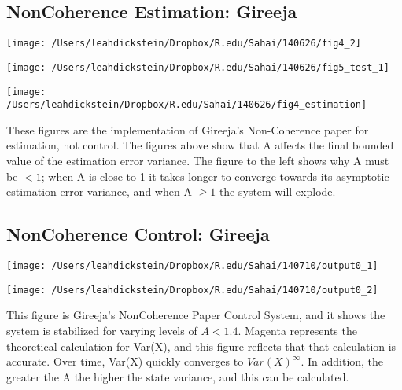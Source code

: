 \documentclass[leqno,twocolumn]{article}
\begin{document}
\subsection{NonCoherence Estimation: Gireeja}
\begin{minipage}[c]{0.5\textwidth}
\texttt{[image: /Users/leahdickstein/Dropbox/R.edu/Sahai/140626/fig4\_2]}
\end{minipage}
\begin{minipage}[c]{0.5\textwidth}
\texttt{[image: /Users/leahdickstein/Dropbox/R.edu/Sahai/140626/fig5\_test\_1]}
\end{minipage}

\begin{minipage}[c]{0.5\textwidth}
\texttt{[image: /Users/leahdickstein/Dropbox/R.edu/Sahai/140626/fig4\_estimation]}
\end{minipage}
\begin{minipage}[b]{0.5\textwidth}
These figures are the implementation of Gireeja's Non-Coherence paper for estimation, not control. The figures above show that A affects the final bounded value of the estimation error variance. The figure to the left shows why A must be $< 1$; when A is close to 1 it takes longer to converge towards its asymptotic estimation error variance, and when A $\geq 1$ the system will explode.
\end{minipage}

\subsection{NonCoherence Control: Gireeja}
\begin{minipage}[c]{0.5\textwidth}
\texttt{[image: /Users/leahdickstein/Dropbox/R.edu/Sahai/140710/output0\_1]}
\end{minipage}
\begin{minipage}[c]{0.5\textwidth}
\texttt{[image: /Users/leahdickstein/Dropbox/R.edu/Sahai/140710/output0\_2]}
\end{minipage}

This figure is Gireeja's NonCoherence Paper Control System, and it shows the system is stabilized for varying levels of $A < 1.4$. Magenta represents the theoretical calculation for Var(X), and this figure reflects that that calculation is accurate. Over time, Var(X) quickly converges to $Var(X)^\infty$. In addition, the greater the A the higher the state variance, and this can be calculated.
\end{document}
